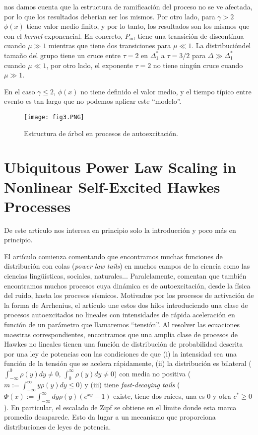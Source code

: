 \documentclass[a4paper,11pt]{book}
\begin{document}
nos damos cuenta que la estructura de ramificación del proceso no se ve afectada, por lo que los resultados deberian ser los mismos. Por otro lado, 
para $\gamma>2$ $\phi(x)$ tiene valor medio finito, y por lo tanto, los resultados son los mismos que con el \textit{kernel} exponencial. En concreto, 
$P_{\inf}$ tiene una transición de discontínua cuando $\mu\gg1$ mientras que tiene dos transiciones para $\mu\ll1$. La distribucióndel tamaño del grupo 
tiene un cruce entre $\tau=2$ en $\Delta^*_1$ a $\tau=3/2$ para $\Delta\gg\Delta_1^*$ cuando $\mu\ll1$, por otro lado, el exponente $\tau=2$ no 
tiene ningún cruce cuando $\mu\gg1$. 

En el caso $\gamma\leq2$, $\phi(x)$ no tiene definido el valor medio, y el tiempo típico entre evento es tan largo que no podemos aplicar este ``modelo''.


\begin{figure}[H]
    \centering
    \texttt{[image: fig3.PNG]}   
    \caption{Estructura de árbol en procesos de autoexcitación.}
    \label{f:fig3} 
\end{figure}

\chapter{Ubiquitous Power Law Scaling in Nonlinear Self-Excited Hawkes Processes}

De este artículo nos interesa en principio solo la introducción y poco más en principio.

El artículo comienza comentando que encontramos muchas funciones de distribución con colas (\textit{power law tails}) en muchos campos de la ciencia como las 
ciencias lingüísticas, sociales, naturales... Paralelamente, comentan que también encontramos muchos procesos cuya dinámica es de autoexcitación, desde la 
física del ruido, hasta los procesos sísmicos. Motivados por los procesos de activación de la forma de Arrhenius, el artículo une estos dos hilos introduciendo
una clase de procesos autoexcitados no lineales con intensidades de rápida aceleración en función de un parámetro que llamaremos ``tensión''. Al resolver 
las ecuaciones maestras correspondientes, encontramos que una amplia clase de procesos de Hawkes no lineales tienen una función de distribución de probabilidad 
descrita por una ley de potencias con las condiciones de que (i) la intensidad sea una función de la tensión que se acelera rápidamente, (ii) la 
distribución es bilateral ($\int_{-\infty}^{0}\rho(y)dy\neq0$, $\int_{0}^{\infty}\rho(y)dy\neq0$) con media no positiva ($m:=\int_{-\infty}^{\infty}y\rho(y)dy\leq0$)
y (iii) tiene \textit{fast-decaying tails} ($\Phi(x):=\int_{-\infty}^{\infty}dy\rho(y)(e^{xy}-1)$ existe, tiene dos raíces, una es $0$ y otra $c^*\geq0$). 
En particular, el escalado de Zipf se obtiene en el 
límite donde esta marca promedio desaparede. Esto da lugar a un mecanismo que proporciona distribuciones de leyes de potencia.
\end{document}
